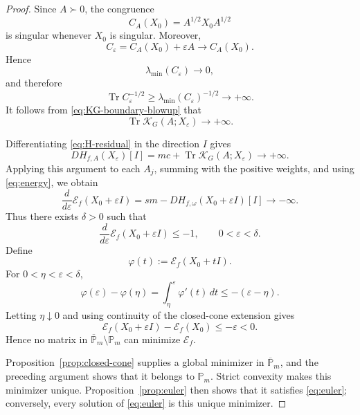 \documentclass[10pt,a4paper]{amsart}
\newcommand{\Pm}{\mathbb P_m}
\newcommand{\Tr}{\operatorname{Tr}}
\begin{document}
\begin{proof}
		Since $A\succ0$, the congruence
		\[
		C_A(X_0)=A^{1/2}X_0A^{1/2}
		\]
		is singular whenever $X_0$ is singular.  Moreover,
		\[
		C_\varepsilon=C_A(X_0)+\varepsilon A
		\longrightarrow C_A(X_0).
		\]
		Hence
		\[
		\lambda_{\min}(C_\varepsilon)\longrightarrow0,
		\]
		and therefore
		\[
		\Tr C_\varepsilon^{-1/2}
		\ge
		\lambda_{\min}(C_\varepsilon)^{-1/2}
		\longrightarrow+\infty.
		\]
		It follows from \eqref{eq:KG-boundary-blowup} that
		\[
		\Tr\mathcal K_G(A;X_\varepsilon)
		\longrightarrow+\infty.
		\]
		
		Differentiating \eqref{eq:H-residual} in the direction $I$ gives
		\[
		DH_{f,A}(X_\varepsilon)[I]
		=mc+\Tr\mathcal K_G(A;X_\varepsilon)
		\longrightarrow+\infty.
		\]
		Applying this argument to each $A_j$, summing with the positive
		weights, and using \eqref{eq:energy}, we obtain
		\[
		\frac{d}{d\varepsilon}
		\mathcal E_f(X_0+\varepsilon I)
		=
		sm-DH_{f,\omega}(X_0+\varepsilon I)[I]
		\longrightarrow-\infty.
		\]
		Thus there exists $\delta>0$ such that
		\[
		\frac{d}{d\varepsilon}
		\mathcal E_f(X_0+\varepsilon I)\le-1,
		\qquad 0<\varepsilon<\delta.
		\]
		Define
		\[
		\varphi(t):=\mathcal E_f(X_0+tI).
		\]
		For $0<\eta<\varepsilon<\delta$,
		\[
		\varphi(\varepsilon)-\varphi(\eta)
		=\int_\eta^\varepsilon\varphi'(t)\,dt
		\le-(\varepsilon-\eta).
		\]
		Letting $\eta\downarrow0$ and using continuity of the closed-cone
		extension gives
		\[
		\mathcal E_f(X_0+\varepsilon I)
		-\mathcal E_f(X_0)
		\le-\varepsilon<0.
		\]
		Hence no matrix in
		$\overline{\mathbb{P}}_m\setminus\Pm$ can minimize $\mathcal E_f$.
		
		Proposition~\ref{prop:closed-cone} supplies a global minimizer in
		$\overline{\mathbb{P}}_m$, and the preceding argument shows that it belongs to
		$\Pm$.  Strict convexity makes this minimizer unique.
		Proposition~\ref{prop:euler} then shows that it satisfies
		\eqref{eq:euler}; conversely, every solution of \eqref{eq:euler} is
		this unique minimizer.
\end{proof}
\end{document}
